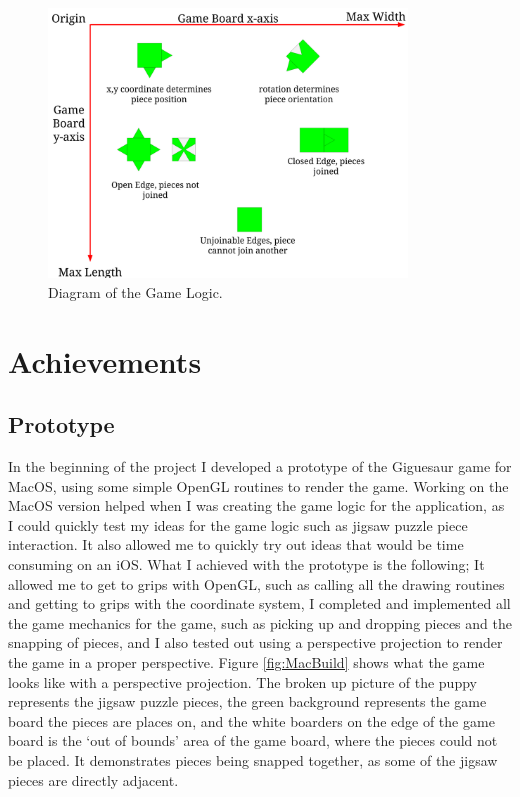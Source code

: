 \documentclass{article}
\begin{document}
\begin{figure}[ht]
\begin{center}
\includegraphics[width=0.85\textwidth, center]{images/GameLogicImage}
\caption{Diagram of the Game Logic.}
\label{fig:GameLogic}
\end{center}
\end{figure}


\section{Achievements}

\subsection{Prototype}
In the beginning of the project I developed a prototype of the Giguesaur game
for MacOS, using some simple OpenGL routines to render the game. Working on the
MacOS version helped when I was creating the game logic for the application, as
I could quickly test my ideas for the game logic such as jigsaw puzzle piece
interaction. It also allowed me to quickly try out ideas that would be time
consuming on an iOS. What I achieved with the prototype is the following; It
allowed me to get to grips with OpenGL, such as calling all the drawing routines
and getting to grips with the coordinate system, I completed and implemented all
the game mechanics for the game, such as picking up and dropping pieces and the
snapping of pieces, and I also tested out using a perspective projection to
render the game in a proper perspective. Figure \ref{fig:MacBuild} shows what
the game looks like with a perspective projection. The broken up picture of the
puppy \cite{img:OpenGLPuppy} represents the jigsaw puzzle pieces, the green
background represents the game board the pieces are places on, and the white
boarders on the edge of the game board is the `out of bounds' area of the game
board, where the pieces could not be placed. It demonstrates pieces being
snapped together, as some of the jigsaw pieces are directly adjacent.
\end{document}
